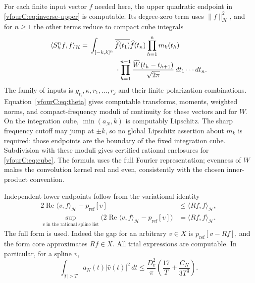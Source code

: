\documentclass[11pt,a4paper]{article}
\numberwithin{equation}{section}
\theoremstyle{definition}\newtheorem{definition}[theorem]{Definition}
\theoremstyle{remark}\newtheorem{remark}[theorem]{Remark}
\newcommand{\Hh}{\mathcal H}\newcommand{\Hw}{\mathcal H}
\newcommand{\ip}[2]{\langle#1,#2\rangle}\newcommand{\norm}[1]{\lVert#1\rVert}\newcommand{\abs}[1]{\lvert#1\rvert}
\begin{document}
For each finite input vector $f$ needed here, the upper quadratic endpoint in
\eqref{vfourC:eq:inverse-upper} is computable.  Its degree-zero term uses
$\norm f_{\Hh}^2$, and for $n\ge1$ the other terms reduce to compact cube
integrals
\begin{equation}\label{vfourC:eq:cube}
 \begin{split}
 \ip{S_k^nf}{f}_{\Hh}
 ={}&\int_{[-k,k]^n}\overline{\widehat f(t_1)}\widehat f(t_n)
       \prod_{h=1}^{n}m_k(t_h)\\
 &\hspace{13mm}\cdot
       \prod_{h=1}^{n-1}\frac{\widehat W(t_h-t_{h+1})}{\sqrt{2\pi}}
       \,dt_1\cdots dt_n.
 \end{split}
\end{equation}
The family of inputs is $g_{t_i},\kappa,r_1,\ldots,r_j$ and their finite
polarization combinations.  Equation~\eqref{vfourC:eq:theta} gives computable
transforms, moments, weighted norms, and compact-frequency moduli of continuity
for these vectors and for $W$.  On the integration cube,
$\min(a_N,k)$ is computably Lipschitz.  The sharp frequency cutoff may jump at
$\pm k$, so no global Lipschitz assertion about $m_k$ is required: those
endpoints are the boundary of the fixed integration cube.  Subdivision with
these moduli gives certified rational enclosures for \eqref{vfourC:eq:cube}.
The formula uses the full Fourier representation; evenness of $W$ makes the
convolution kernel real and even, consistently with the chosen inner-product
convention.

Independent lower endpoints follow from the variational identity
\begin{equation}\label{vfourC:eq:inverse-lower}
 \begin{split}
 2\operatorname{Re}\ip{v}{f}_{\Hh}-p_{\mathrm{ref}}[v]
       &\le\ip{Rf}{f}_{\Hh},\\
 \sup_{v\text{ in the rational spline list}}
       \bigl(2\operatorname{Re}\ip{v}{f}_{\Hh}
                      -p_{\mathrm{ref}}[v]\bigr)
       &=\ip{Rf}{f}_{\Hh}.
 \end{split}
\end{equation}
The full form is used.  Indeed the gap for an arbitrary $v\in X$ is
$p_{\mathrm{ref}}[v-Rf]$, and the form core approximates $Rf\in X$.
All trial expressions are computable.  In particular, for a spline $v$,
\begin{equation}\label{vfourC:eq:reference-tail}
 \int_{|t|>T}a_N(t)|\widehat v(t)|^2\,dt
       \le\frac{D_v^2}{\pi}
                   \left(\frac{17}{T}+\frac{C_N}{3T^3}\right).
\end{equation}
\end{document}
